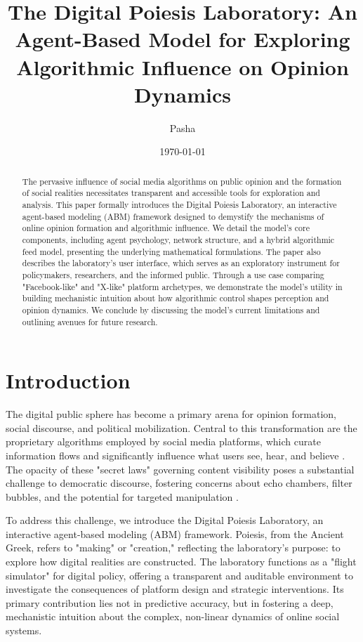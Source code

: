 \documentclass[10pt,a4paper]{article}
\title{The Digital Poiesis Laboratory: An Agent-Based Model for Exploring Algorithmic Influence on Opinion Dynamics}
\author[\thanks{Corresponding Author: pasha@digitalpoiesis.lab}]{Pasha}
\affil[ ]{Digital Poiesis Lab}
\date{\today}
\begin{document}
\maketitle

\begin{abstract}
The pervasive influence of social media algorithms on public opinion and the formation of social realities necessitates transparent and accessible tools for exploration and analysis. This paper formally introduces the Digital Poiesis Laboratory, an interactive agent-based modeling (ABM) framework designed to demystify the mechanisms of online opinion formation and algorithmic influence. We detail the model's core components, including agent psychology, network structure, and a hybrid algorithmic feed model, presenting the underlying mathematical formulations. The paper also describes the laboratory's user interface, which serves as an exploratory instrument for policymakers, researchers, and the informed public. Through a use case comparing "Facebook-like" and "X-like" platform archetypes, we demonstrate the model's utility in building mechanistic intuition about how algorithmic control shapes perception and opinion dynamics. We conclude by discussing the model's current limitations and outlining avenues for future research.
\end{abstract}

\section{Introduction}
The digital public sphere has become a primary arena for opinion formation, social discourse, and political mobilization. Central to this transformation are the proprietary algorithms employed by social media platforms, which curate information flows and significantly influence what users see, hear, and believe \citep{algorithmic_amplification}. The opacity of these "secret laws" governing content visibility poses a substantial challenge to democratic discourse, fostering concerns about echo chambers, filter bubbles, and the potential for targeted manipulation \citep{pariser2011filter}.

To address this challenge, we introduce the Digital Poiesis Laboratory, an interactive agent-based modeling (ABM) framework. Poiesis, from the Ancient Greek, refers to "making" or "creation," reflecting the laboratory's purpose: to explore how digital realities are constructed. The laboratory functions as a "flight simulator" for digital policy, offering a transparent and auditable environment to investigate the consequences of platform design and strategic interventions. Its primary contribution lies not in predictive accuracy, but in fostering a deep, mechanistic intuition about the complex, non-linear dynamics of online social systems.
\end{document}

